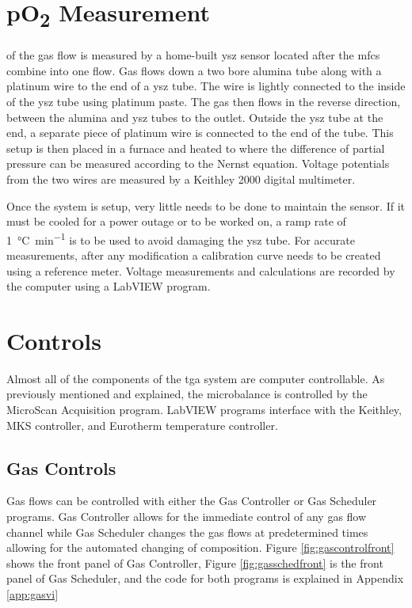 \section{pO\textsubscript{2} Measurement}
     of the gas flow is measured by a home-built \gls{ysz} sensor located after the \glspl{mfc} combine into one flow.
    Gas flows down a two bore alumina tube along with a platinum wire to the end of a \gls{ysz} tube.
    The wire is lightly connected to the inside of the \gls{ysz} tube using platinum paste.
    The gas then flows in the reverse direction, between the alumina and \gls{ysz} tubes to the outlet.
    Outside the \gls{ysz} tube at the end, a separate piece of platinum wire is connected to the end of the tube.
    This setup is then placed in a furnace and heated to  where the difference of partial pressure can be measured according to the Nernst equation.
    Voltage potentials from the two wires are measured by a Keithley 2000 digital multimeter.

    Once the system is setup, very little needs to be done to maintain the sensor.
    If it must be cooled for a power outage or to be worked on, a ramp rate of \SI{1}{\celsius\per\minute} is to be used to avoid damaging the \gls{ysz} tube.
    For accurate  measurements, after any modification a calibration curve needs to be created using a reference meter.
    Voltage measurements and  calculations are recorded by the computer using a LabVIEW program.

\section{Controls}
    Almost all of the components of the \gls{tga} system are computer controllable.
    As previously mentioned and explained, the microbalance is controlled by the MicroScan Acquisition program.
    LabVIEW programs interface with the Keithley, MKS controller, and Eurotherm temperature controller.

    \subsection{Gas Controls}
        Gas flows can be controlled with either the Gas Controller or Gas Scheduler programs.
        Gas Controller allows for the immediate control of any gas flow channel while Gas Scheduler changes the gas flows at predetermined times allowing for the automated changing of composition.
        Figure \ref{fig:gascontrolfront} shows the front panel of Gas Controller, Figure \ref{fig:gasschedfront} is the front panel of Gas Scheduler, and the code for both programs is explained in Appendix \ref{app:gasvi}

